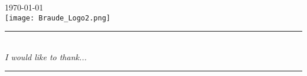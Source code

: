 \documentclass[12pt]{article}
\begin{document}
\begin{titlepage}


{\large \today}\\[2cm] %


\texttt{[image: Braude\_Logo2.png]}\\[1cm] %


\vfill %

\end{titlepage}


\rule{\linewidth}{0.1mm}\\[0.4cm]
{ \huge  \emph{I would like to thank...}}\\[0.4cm] %
\rule{\linewidth}{0.1mm}\\[0.4cm]

\newpage
\tableofcontents

\newpage
\end{document}
